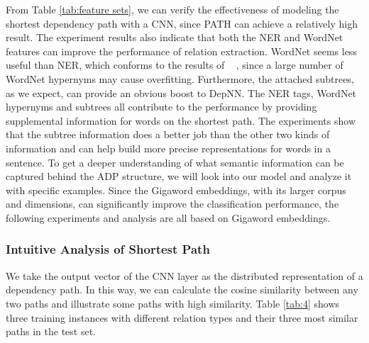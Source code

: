\documentclass[11pt]{article}
\begin{document}
From Table \ref{tab:feature sets}, we can verify the effectiveness of modeling the shortest dependency path with a CNN, since PATH can achieve a relatively high result. The experiment results also indicate that both the NER and WordNet features can improve the performance of relation extraction.
WordNet seems less useful than NER,  which conforms to the results of ~ , since a large number of WordNet hypernyms may cause overfitting. Furthermore, the attached subtrees, as we expect, can provide an obvious boost to DepNN.
The NER tags, WordNet hypernyms and subtrees all contribute to the performance by providing supplemental information for words on the shortest path. The experiments show that the subtree information does a better job than the other two kinds of information and can help build more precise representations for words in a sentence.
To get a deeper understanding of what semantic information can be captured behind the ADP structure, we will look into our model and analyze it with specific examples. Since the Gigaword embeddings, with its larger corpus and dimensions, can significantly improve the classification performance, the following experiments and analysis are all based on Gigaword embeddings.



\subsubsection{Intuitive Analysis of Shortest Path}
We take the output vector of the CNN layer as the distributed representation of a dependency path. In this way, we can calculate the cosine similarity between any two paths and illustrate some paths with high similarity.
Table \ref{tab:4} shows three training instances with different relation types and their three most similar paths in the test set.
\end{document}
